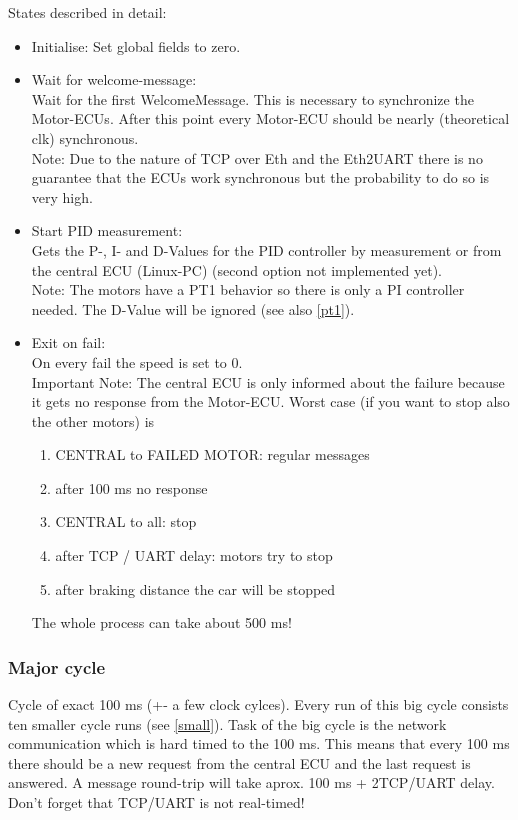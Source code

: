States described in detail:
\begin{itemize}
\item Initialise: Set global fields to zero.
\item Wait for welcome-message:\\
Wait for the first WelcomeMessage. This is necessary to synchronize the Motor-ECUs. After this point every Motor-ECU should be nearly (theoretical clk) synchronous.\\
Note: Due to the nature of TCP over Eth and the Eth2UART there is no guarantee that the ECUs work synchronous but the probability to do so is very high.
\item Start PID measurement:\\
Gets the P-, I- and D-Values for the PID controller by measurement or from the central ECU (Linux-PC) (second option not implemented yet). \\
Note: The motors have a PT1 behavior so there is only a PI controller needed. The D-Value will be ignored (see also \ref{pt1}).

\item Exit on fail:\\
On every fail the speed is set to 0.\\
Important Note: The central ECU is only informed about the failure because it gets no
response from the Motor-ECU. Worst case (if you want to stop also the other motors) is
			\begin{enumerate}
				\item CENTRAL to FAILED MOTOR: regular messages
                \item after 100 ms no response
                \item CENTRAL to all: stop
                \item after TCP / UART delay: motors try to stop
                \item after braking distance the car will be stopped
			\end{enumerate}
The whole process can take about 500 ms!
\end{itemize}

\subsubsection{Major cycle}

Cycle of exact 100 ms (+- a few clock cylces). Every run of this big cycle consists ten smaller cycle runs (see \ref{small}). Task of the big cycle is the network communication which is hard timed to the 100 ms. This means that every 100 ms there should be a new request from the central ECU and the last request is answered. A message round-trip will take aprox. 100 ms + 2TCP/UART delay. Don't forget that TCP/UART is not real-timed!\\

